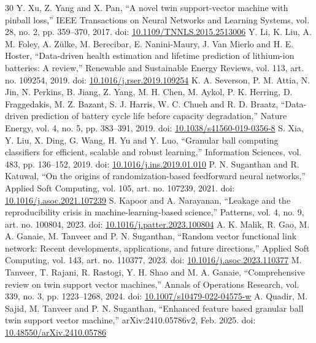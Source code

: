 \documentclass[conference,a4paper]{IEEEtran}
\begin{document}
\begin{thebibliography}{30}
 Y. Xu, Z. Yang and X. Pan, ``A novel twin support-vector machine with pinball loss,'' IEEE Transactions on Neural Networks and Learning Systems, vol. 28, no. 2, pp. 359--370, 2017. doi: \href{https://doi.org/10.1109/TNNLS.2015.2513006}{10.1109/TNNLS.2015.2513006}
 Y. Li, K. Liu, A. M. Foley, A. Z\"ulke, M. Berecibar, E. Nanini-Maury, J. Van Mierlo and H. E. Hoster, ``Data-driven health estimation and lifetime prediction of lithium-ion batteries: A review,'' Renewable and Sustainable Energy Reviews, vol. 113, art. no. 109254, 2019. doi: \href{https://doi.org/10.1016/j.rser.2019.109254}{10.1016/j.rser.2019.109254}
 K. A. Severson, P. M. Attia, N. Jin, N. Perkins, B. Jiang, Z. Yang, M. H. Chen, M. Aykol, P. K. Herring, D. Fraggedakis, M. Z. Bazant, S. J. Harris, W. C. Chueh and R. D. Braatz, ``Data-driven prediction of battery cycle life before capacity degradation,'' Nature Energy, vol. 4, no. 5, pp. 383--391, 2019. doi: \href{https://doi.org/10.1038/s41560-019-0356-8}{10.1038/s41560-019-0356-8}
 S. Xia, Y. Liu, X. Ding, G. Wang, H. Yu and Y. Luo, ``Granular ball computing classifiers for efficient, scalable and robust learning,'' Information Sciences, vol. 483, pp. 136--152, 2019. doi: \href{https://doi.org/10.1016/j.ins.2019.01.010}{10.1016/j.ins.2019.01.010}
 P. N. Suganthan and R. Katuwal, ``On the origins of randomization-based feedforward neural networks,'' Applied Soft Computing, vol. 105, art. no. 107239, 2021. doi: \href{https://doi.org/10.1016/j.asoc.2021.107239}{10.1016/j.asoc.2021.107239}
 S. Kapoor and A. Narayanan, ``Leakage and the reproducibility crisis in machine-learning-based science,'' Patterns, vol. 4, no. 9, art. no. 100804, 2023. doi: \href{https://doi.org/10.1016/j.patter.2023.100804}{10.1016/j.patter.2023.100804}
 A. K. Malik, R. Gao, M. A. Ganaie, M. Tanveer and P. N. Suganthan, ``Random vector functional link network: Recent developments, applications, and future directions,'' Applied Soft Computing, vol. 143, art. no. 110377, 2023. doi: \href{https://doi.org/10.1016/j.asoc.2023.110377}{10.1016/j.asoc.2023.110377}
 M. Tanveer, T. Rajani, R. Rastogi, Y. H. Shao and M. A. Ganaie, ``Comprehensive review on twin support vector machines,'' Annals of Operations Research, vol. 339, no. 3, pp. 1223--1268, 2024. doi: \href{https://doi.org/10.1007/s10479-022-04575-w}{10.1007/s10479-022-04575-w}
 A. Quadir, M. Sajid, M. Tanveer and P. N. Suganthan, ``Enhanced feature based granular ball twin support vector machine,'' arXiv:2410.05786v2, Feb. 2025. doi: \href{https://doi.org/10.48550/arXiv.2410.05786}{10.48550/arXiv.2410.05786}

\end{thebibliography}
\end{document}
